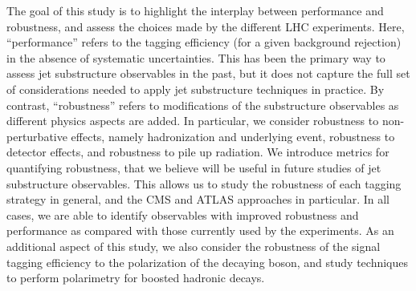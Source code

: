 \documentclass[11pt,letterpaper]{article}
\begin{document}
The goal of this study is to highlight the interplay between performance and robustness, and assess the choices made by the different LHC experiments.
%
Here, ``performance'' refers to the tagging efficiency (for a given background rejection) in the absence of systematic uncertainties.
%
This has been the primary way to assess jet substructure observables in the past, but it does not capture the full set of considerations needed to apply jet substructure techniques in practice.
%
By contrast, ``robustness'' refers to modifications of the substructure observables as different physics aspects are added.
%
In particular, we consider robustness to non-perturbative effects, namely hadronization and underlying event, robustness to detector effects, and robustness to pile up radiation.
%
We introduce metrics for quantifying robustness, that we believe will be useful in future studies of jet substructure observables.
%
This allows us to study the robustness of each tagging strategy in general, and the CMS and ATLAS approaches in particular.
%
In all cases, we are able to identify observables with improved robustness and performance as compared with those currently used by the experiments.
%
%
As an additional aspect of this study, we also consider the robustness of the signal tagging efficiency to the polarization of the decaying boson, and study techniques to perform polarimetry for boosted hadronic decays. 




 







 
 


\end{document}
